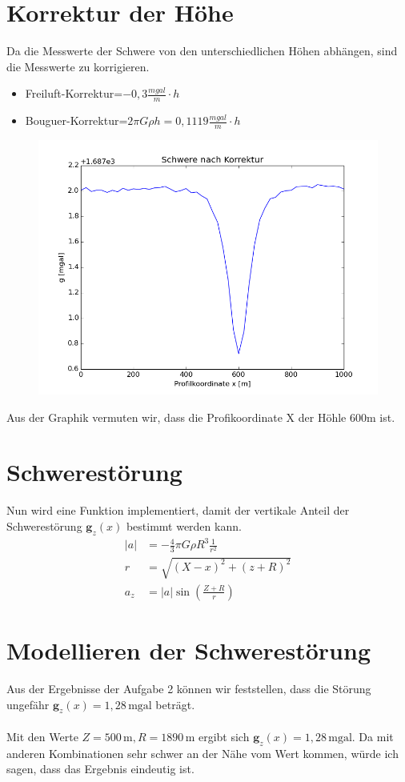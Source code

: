 \documentclass[12pt
,headinclude
,headsepline
,bibtotocnumbered
]{scrartcl}
\begin{document}
\section{Korrektur der Höhe}
Da die Messwerte der Schwere von den unterschiedlichen Höhen abhängen, sind die Messwerte zu korrigieren.
\begin{itemize}
	\item Freiluft-Korrektur=$-0,3\frac{mgal}{m}\cdot h$
	\item Bouguer-Korrektur=$2\pi G \rho h=0,1119\frac{mgal}{m}\cdot h$
\end{itemize}
\begin{figure}[H]
	\includegraphics[width=15cm]{figure_2}
\end{figure}
Aus der Graphik vermuten wir, dass die Profikoordinate X der Höhle 600m ist.
\section{Schwerestörung}
Nun wird eine Funktion implementiert, damit der vertikale Anteil der Schwerestörung $\boldsymbol{g}_z(x)$ bestimmt werden kann.
\begin{align*}
	|a|&=-\frac{4}{3}\pi G\rho R^3\frac{1}{r^2}\\
	r&=\sqrt{(X-x)^2+(z+R)^2}\\
	a_z&=|a|\sin(\frac{Z+R}{r})
\end{align*}
\section{Modellieren der Schwerestörung}
Aus der Ergebnisse der Aufgabe 2 können wir feststellen, dass die Störung ungefähr $\boldsymbol{g}_z(x)=1,28\,\mathrm{mgal}$ beträgt.
\\ \\
Mit den Werte $Z=500\,\mathrm{m}, R=1890\,\mathrm{m}$ ergibt sich $\boldsymbol{g}_z(x)=1,28\,\mathrm{mgal}$. Da mit anderen Kombinationen sehr schwer an der Nähe vom Wert kommen, würde ich sagen, dass das Ergebnis eindeutig ist.
\end{document}

